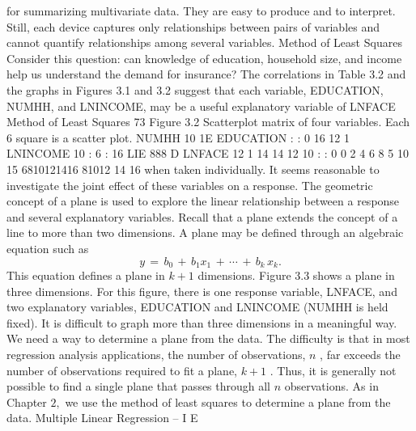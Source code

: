 \documentclass[11pt]{article}
\begin{document}
for summarizing multivariate data. They are easy to produce and to interpret. Still,
each device captures only relationships between pairs of variables and cannot
 quantify relationships among several variables.
 Method of Least Squares
Consider this question: can knowledge of education, household size, and income
 help us understand the demand for insurance? The correlations in Table 3.2 and
the graphs in Figures 3.1 and 3.2 suggest that each variable, EDUCATION,
NUMHH, and LNINCOME, may be a useful explanatory variable of LNFACE
 Method of Least Squares 73
Figure 3.2
Scatterplot matrix of
four variables. Each
6 square is a scatter plot.
NUMHH
10 1E EDUCATION
:
:
0
16
12 1 LNINCOME
10 :
6 :
16 LIE 888 D LNFACE 12
1 14
14
12
10
:
:
0 0
2 4 6 8 5 10 15 6810121416 81012 14 16
when taken individually. It seems reasonable to investigate the joint effect of
 these variables on a response.
The geometric concept of a plane is used to explore the linear relationship
 between a response and several explanatory variables. Recall that a plane extends
the concept of a line to more than two dimensions. \(\mathrm{A}\) plane may be defined
 through an algebraic equation such as
\[
y \,=\, b_{0} \,+\, b_{1} x_{1} \,+\, \cdots\,+\, b_{k} \, x_{k} .
\]
 This equation defines a plane in \(k+1\) dimensions. Figure 3.3 shows a plane
in three dimensions. For this figure, there is one response variable, LNFACE,
and two explanatory variables, EDUCATION and LNINCOME (NUMHH is
held fixed). It is difficult to graph more than three dimensions in a meaningful
way.
We need a way to determine a plane from the data. The difficulty is that in
 most regression analysis applications, the number of observations, \(n\) , far exceeds
 the number of observations required to fit a plane, \(k+1\) . Thus, it is generally
 not possible to find a single plane that passes through all \(n\) observations. As in
Chapter \(2 ,\) we use the method of least squares to determine a plane from the data.
 Multiple Linear Regression -- I
E
\end{document}
